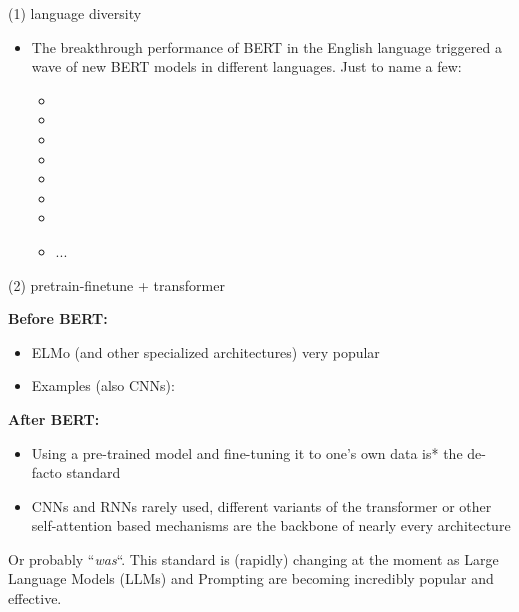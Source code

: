 \begin{frame}{(1) language diversity}

\vfill

\begin{itemize}
	\item The breakthrough performance of BERT in the English language triggered a wave of new
				BERT models in different languages. Just to name a few:
			\begin{itemize}
				\item {}
				\item {}
				\item {}
				\item {}
				\item {}
				\item {}
				\item {}
				\item ...
			\end{itemize}
\end{itemize}
	
\vfill

\end{frame}


\begin{frame}{(2) pretrain-finetune + transformer}

\vfill

\textbf{Before BERT:} 
			\begin{itemize}
				\item ELMo (and other specialized architectures) very popular
				\item Examples (also CNNs): 
			\end{itemize}
\textbf{After BERT:}
			\begin{itemize}
				\item Using a pre-trained model and fine-tuning it to one's own data is* the de-facto standard
				\item CNNs and RNNs rarely used, different variants of the transformer or other self-attention based mechanisms are the backbone of nearly every architecture
			\end{itemize}

\vfill

{\scriptsize *Or probably ``\textit{was}``. This standard is (rapidly) changing at the moment as Large Language Models (LLMs) and Prompting are becoming incredibly popular and effective.}
\end{frame}

